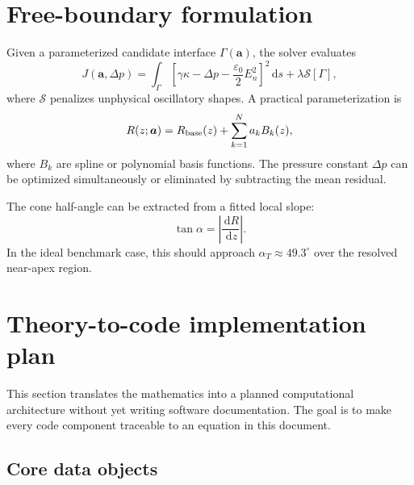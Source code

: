 \documentclass[11pt]{article}
\newcommand{\eps}{\varepsilon}
\newcommand{\abs}[1]{\left|#1\right|}
\newcommand{\dd}{\,\mathrm{d}}
\begin{document}
\section{Free-boundary formulation}

Given a parameterized candidate interface \(\Gamma(\bm a)\), the solver evaluates
\begin{equation}
    J(\bm a,\Delta p)=\int_\Gamma\left[\gamma\kappa-\Delta p-\frac{\eps_0}{2}E_n^2\right]^2\dd s+\lambda\mathcal{S}[\Gamma],
    \label{eq:shape_objective}
\end{equation}
where \(\mathcal{S}\) penalizes unphysical oscillatory shapes. A practical parameterization is
\begin{equation}
    R(z;\bm a)=R_{\rm base}(z)+\sum_{k=1}^N a_kB_k(z),
\end{equation}
where \(B_k\) are spline or polynomial basis functions. The pressure constant \(\Delta p\) can be optimized simultaneously or eliminated by subtracting the mean residual.

The cone half-angle can be extracted from a fitted local slope:
\begin{equation}
    \tan\alpha=\abs{\frac{\dd R}{\dd z}}.
\end{equation}
In the ideal benchmark case, this should approach \(\alpha_T\approx49.3^\circ\) over the resolved near-apex region.

\section{Theory-to-code implementation plan}
\label{sec:implementation_plan}

This section translates the mathematics into a planned computational architecture without yet writing software documentation. The goal is to make every code component traceable to an equation in this document.

\subsection{Core data objects}
\end{document}
